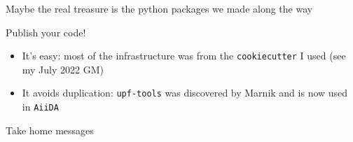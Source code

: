 \documentclass[xcolor=table,aspectratio=169]{beamer}
\numberwithin{equation}{section}
\begin{document}
\begin{frame}{\footnotesize Maybe the real treasure is the python packages we made along the way}

    Publish your code!
    \begin{itemize}
        \item It's easy: most of the infrastructure was from the \texttt{cookiecutter} I used (see my July 2022 GM)
        \item It avoids duplication: \texttt{upf-tools} was discovered by Marnik and is now used in \texttt{AiiDA}
    \end{itemize}
    
\end{frame}

\begin{frame}{Take home messages}


\end{frame}
\end{document}
